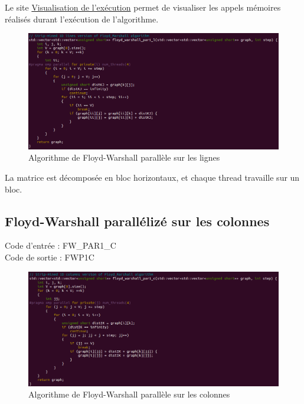 \documentclass[a4paper,11pt]{article}
\begin{document}
Le site \href{https ://www.cs.usfca.edu/galles/visualization/Floyd.html}{Visualisation de l'exécution} permet de visualiser les appels mémoires réalisés durant l'exécution de l'algorithme.\\

\begin{figure}[H]
\begin{center}
  \includegraphics[scale=0.6]{FW_PAR1_L.png}
  \caption{Algorithme de Floyd-Warshall parallèle sur les lignes}
\end{center}
\end{figure}

La matrice est décomposée en bloc horizontaux, et chaque thread travaille sur un bloc.

\subsection{Floyd-Warshall parallélizé sur les colonnes}

\noindent Code d'entrée : FW\_PAR1\_C \\
Code de sortie : FWP1C

\begin{figure}[H]
\begin{center}
  \includegraphics[scale=0.6]{FW_PAR1_C.png}
  \caption{Algorithme de Floyd-Warshall parallèle sur les colonnes}
\end{center}
\end{figure}
\end{document}
